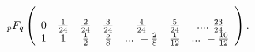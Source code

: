 \begin{equation}
\label{eq:PFsol1}
\ _pF_q\left(\begin{array}{ccccccc}\\
0 & {1\over24} & {2\over24} & {3\over24} & {4\over24} & {5\over24} & ....\ {23\over24}\\
1 & 1 & {1\over2} & {5\over8} & ...\ -{2\over8} & {1\over12} & ...\ -{10\over12}\\
\end{array}\right).
\end{equation}


